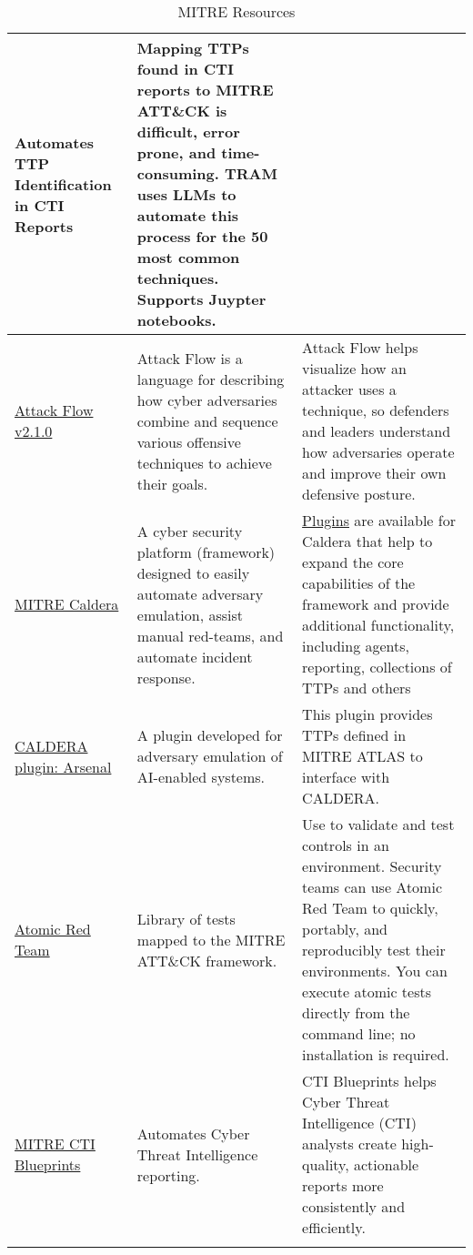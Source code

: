 \begin{longtable}[c]{|p{}|p{}|p{}|}
  Automates TTP Identification in CTI Reports &
  Mapping TTPs found in CTI reports to MITRE ATT\&CK is difficult, error prone,
  and time-consuming. TRAM uses LLMs to automate this process for the 50 most
  common techniques. Supports Juypter notebooks. \\
  \hline
  \href{https://center-for-threat-informed-defense.github.io/attack-flow/}{Attack Flow v2.1.0} &
  Attack Flow is a language for describing how cyber adversaries combine and
  sequence various offensive techniques to achieve their goals.  &
  Attack Flow helps visualize how an attacker uses a technique, so defenders
  and leaders understand how adversaries operate and improve their own
  defensive posture. \\
  \hline
  \href{https://caldera.mitre.org/}{MITRE Caldera} &
  A cyber security platform (framework) designed to easily automate adversary
  emulation, assist manual red-teams, and automate incident response. &
  \href{https://caldera.readthedocs.io/en/latest/Plugin-library.html}{Plugins} are available for Caldera that help to expand the core capabilities
  of the framework and provide additional functionality, including agents,
  reporting, collections of TTPs and others
 \\
  \hline
  \href{https://github.com/mitre-atlas/arsenal}{CALDERA plugin: Arsenal} &
  A plugin developed for adversary emulation of AI-enabled systems.  &
  This plugin provides TTPs defined in MITRE ATLAS to interface with CALDERA. \\
  \hline
  \href{https://github.com/redcanaryco/atomic-red-team}{Atomic Red Team} &
  Library of tests mapped to the MITRE ATT\&CK framework. &
  Use to validate and test controls in an environment. Security teams can use
  Atomic Red Team to quickly, portably, and reproducibly test their environments.
  You can execute atomic tests directly from the command line; no installation
  is required.
 \\
  \hline
  \href{https://mitre-engenuity.org/cybersecurity/center-for-threat-informed-defense/our-work/cti-blueprints/}{MITRE CTI Blueprints} &
  Automates Cyber Threat Intelligence reporting. &
  CTI Blueprints helps Cyber Threat Intelligence (CTI) analysts create
  high-quality, actionable reports more consistently and efficiently.
 \\
  \hline
  \caption{MITRE Resources}
  \label{tab:mitre-resources}
\end{longtable}
